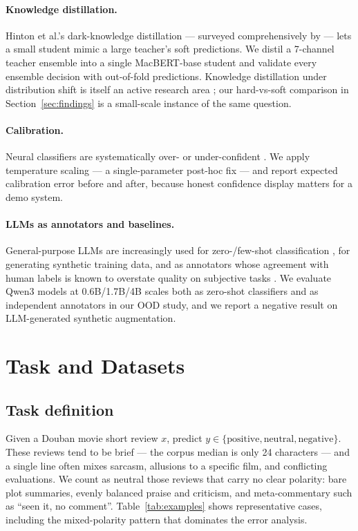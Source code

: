 \documentclass[11pt,a4paper]{article}
\begin{document}
\paragraph{Knowledge distillation.}
Hinton et al.'s dark-knowledge distillation \citep{hinton2015}
--- surveyed comprehensively by \citet{gou2021} --- lets a
small student mimic a large teacher's soft predictions. We distil a
7-channel teacher ensemble into a single MacBERT-base student and
validate every ensemble decision with out-of-fold predictions.
Knowledge distillation under distribution shift is itself an active
research area \citep{zhang2023shiftkd}; our hard-vs-soft comparison
in Section~\ref{sec:findings} is a small-scale instance of the same
question.

\paragraph{Calibration.}
Neural classifiers are systematically over- or under-confident
\citep{guo2017}. We apply temperature scaling --- a single-parameter
post-hoc fix --- and report expected calibration error before and
after, because honest confidence display matters for a demo system.

\paragraph{LLMs as annotators and baselines.}
General-purpose LLMs are increasingly used for zero-/few-shot
classification \citep{gilardi2023,tornberg2023}, for generating
synthetic training data, and as annotators whose agreement with human
labels is known to overstate quality on subjective tasks
\citep{moller2024parrot,schroeder2025}. We evaluate
Qwen3 models \citep{qwen2025} at 0.6B/1.7B/4B scales both as zero-shot
classifiers and as independent annotators in our OOD study, and we
report a negative result on LLM-generated synthetic augmentation.

\section{Task and Datasets}
\label{sec:data}

\subsection{Task definition}

Given a Douban movie short review $x$, predict
$y \in \{\text{positive}, \text{neutral}, \text{negative}\}$. These
reviews tend to be brief --- the corpus median is only 24 characters
--- and a single line often mixes sarcasm, allusions to a specific
film, and conflicting evaluations. We count as neutral those reviews
that carry no clear polarity: bare plot summaries, evenly balanced
praise and criticism, and meta-commentary such as ``seen it, no
comment''. Table~\ref{tab:examples} shows representative cases,
including the mixed-polarity pattern that dominates the error
analysis.
\end{document}
